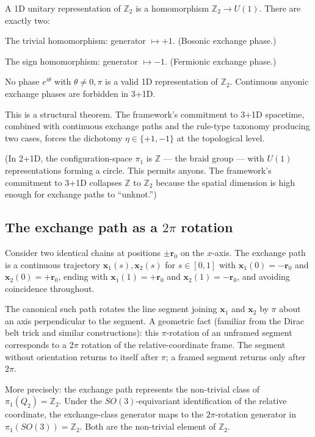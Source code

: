 \documentclass[11pt,a4paper]{article}
\begin{document}
A 1D unitary representation of $\mathbb{Z}_2$ is a homomorphism $\mathbb{Z}_2 \to U(1)$. There are exactly two:

The trivial homomorphism: generator $\mapsto +1$. (Bosonic exchange phase.)

The sign homomorphism: generator $\mapsto -1$. (Fermionic exchange phase.)

No phase $e^{i\theta}$ with $\theta \neq 0, \pi$ is a valid 1D representation of $\mathbb{Z}_2$. Continuous anyonic exchange phases are forbidden in 3+1D.

This is a structural theorem. The framework's commitment to 3+1D spacetime, combined with continuous exchange paths and the rule-type taxonomy producing two cases, forces the dichotomy $\eta \in \{+1, -1\}$ at the topological level.

(In 2+1D, the configuration-space $\pi_1$ is $\mathbb{Z}$ --- the braid group --- with $U(1)$ representations forming a circle. This permits anyons. The framework's commitment to 3+1D collapses $\mathbb{Z}$ to $\mathbb{Z}_2$ because the spatial dimension is high enough for exchange paths to ``unknot.'')

\subsection{The exchange path as a $2\pi$ rotation}

Consider two identical chains at positions $\pm\mathbf{r}_0$ on the $x$-axis. The exchange path is a continuous trajectory $\mathbf{x}_1(s), \mathbf{x}_2(s)$ for $s \in [0, 1]$ with $\mathbf{x}_1(0) = -\mathbf{r}_0$ and $\mathbf{x}_2(0) = +\mathbf{r}_0$, ending with $\mathbf{x}_1(1) = +\mathbf{r}_0$ and $\mathbf{x}_2(1) = -\mathbf{r}_0$, and avoiding coincidence throughout.

The canonical such path rotates the line segment joining $\mathbf{x}_1$ and $\mathbf{x}_2$ by $\pi$ about an axis perpendicular to the segment. A geometric fact (familiar from the Dirac belt trick and similar constructions): this $\pi$-rotation of an unframed segment corresponds to a $2\pi$ rotation of the relative-coordinate frame. The segment without orientation returns to itself after $\pi$; a framed segment returns only after $2\pi$.

More precisely: the exchange path represents the non-trivial class of $\pi_1(Q_2) = \mathbb{Z}_2$. Under the $SO(3)$-equivariant identification of the relative coordinate, the exchange-class generator maps to the $2\pi$-rotation generator in $\pi_1(SO(3)) = \mathbb{Z}_2$. Both are the non-trivial element of $\mathbb{Z}_2$.
\end{document}
